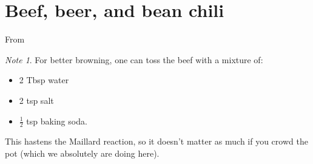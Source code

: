\documentclass[a4paper,12pt]{scrreprt}
\theoremstyle{definition}
\theoremstyle{plain}
\theoremstyle{remark}
\newtheorem{note}{Note}[section]
\begin{document}
\section{Beef, beer, and bean chili}\label{sec:beef_beer_and_bean_chili}
From \cite{foodwishesbeefbeanbeerchili}

\begin{note}
  For better browning, one can toss the beef with a mixture of:
  \begin{itemize}
    \item 2 Tbsp water

    \item 2 tsp salt

    \item $\frac{1}{2}$ tsp baking soda.
  \end{itemize}
  This hastens the Maillard reaction, so it doesn't matter as much if you crowd the pot (which we absolutely are doing here).
\end{note}
\end{document}
